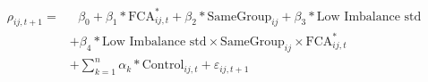 \textsl{}\begin{equation}
\begin{split}
\rho_{ij,t+1} = & \text{ 	}\beta_0 + \beta_1* \text{FCA}^*_{ij,t} + \beta_2* \text{SameGroup}_{ij} + \beta_3 * \text{Low Imbalance std} \\
 & 	+\beta_4* \text{Low Imbalance std} \times \text{SameGroup}_{ij} \times \text{FCA}^*_{ij,t}   \\
  & + \sum_{k=1} ^{n} \alpha_k*\text{Control}_{ij,t} + \varepsilon_{ij,t+1}
\end{split}
\label{model1}
\end{equation}